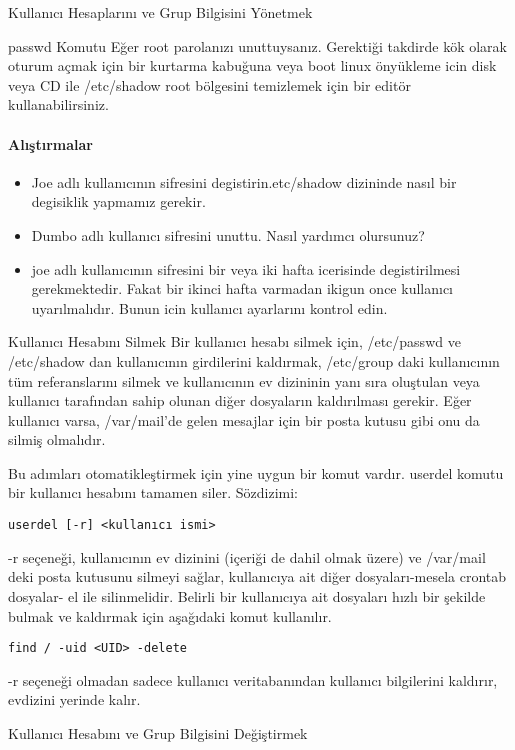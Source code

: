 \begin{section}{Kullanıcı Hesaplarını ve Grup Bilgisini Yönetmek}
\begin{subsection}{passwd Komutu}
Eğer root parolanızı unuttuysanız. Gerektiği takdirde kök olarak oturum açmak için bir kurtarma kabuğuna veya boot linux önyükleme icin disk veya CD ile /etc/shadow root bölgesini temizlemek için bir editör kullanabilirsiniz.
\paragraph{Alıştırmalar}{
\begin{itemize}
\item Joe adlı kullanıcının  sifresini degistirin.etc/shadow dizininde nasıl bir degisiklik yapmamız gerekir.
\item Dumbo adlı kullanıcı sifresini unuttu. Nasıl yardımcı olursunuz?
\item joe adlı kullanıcının sifresini bir veya iki hafta icerisinde degistirilmesi gerekmektedir. Fakat bir ikinci hafta varmadan ikigun once kullanıcı uyarılmalıdır. Bunun icin kullanıcı ayarlarını kontrol edin.
\end{itemize}}
\end{subsection}
\begin{subsection}{Kullanıcı Hesabını Silmek}
Bir kullanıcı hesabı silmek için, /etc/passwd ve /etc/shadow dan kullanıcının girdilerini kaldırmak, /etc/group daki kullanıcının tüm referanslarını silmek ve kullanıcının ev dizininin yanı sıra oluştulan veya kullanıcı tarafından sahip olunan diğer dosyaların kaldırılması gerekir. Eğer kullanıcı varsa, /var/mail'de gelen mesajlar için bir posta kutusu gibi onu da silmiş olmalıdır.

Bu adımları otomatikleştirmek için yine uygun bir komut vardır. userdel komutu bir kullanıcı hesabını tamamen siler. Sözdizimi:
\begin{verbatim}
userdel [-r] <kullanıcı ismi>
\end{verbatim}

-r seçeneği, kullanıcının ev dizinini (içeriği de dahil olmak üzere) ve /var/mail deki posta kutusunu silmeyi sağlar, kullanıcıya ait diğer dosyaları-mesela crontab dosyalar- el ile silinmelidir. Belirli bir kullanıcıya ait dosyaları hızlı bir şekilde bulmak ve kaldırmak için aşağıdaki komut kullanılır.
\begin{verbatim}
find / -uid <UID> -delete
\end{verbatim}
-r seçeneği olmadan sadece kullanıcı veritabanından kullanıcı bilgilerini kaldırır, evdizini yerinde kalır.
\end{subsection}
\begin{subsection}{Kullanıcı Hesabını ve Grup Bilgisini Değiştirmek}


\end{subsection}
\end{section}

